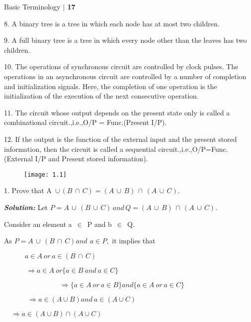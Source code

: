 \documentclass[10pt,a4paper]{book}
\begin{document}
\scriptsize

\begin{flushright}
\textsf{Basic Terminology}  \textbf{$|$ 17}
\end{flushright}


\begin{flushleft}
8. A binary tree is a tree in which each node has at most two children.

9. A full binary tree is a tree in which every node other than the leaves has two children.

10. The operations of synchronous circuit are controlled by clock pulses. The operations in an asynchronous circuit are controlled by a number of completion and initialization signals. Here, the
completion of one operation is the initialization of the execution of the next consecutive operation.

11. The circuit whose output depends on the present state only is called a combinational circuit.,i.e.,O/P = Func.(Present I/P).

12. If the output is the function of the external input and the present stored information, then the circuit
is called a sequential circuit.,i.e.,O/P=Func.(External I/P and Present stored information).
\end{flushleft}

\begin{figure}[h]
  \centering
  \texttt{[image: 1.1]}\\
\end{figure}

\begin{flushleft}
  1. Prove that A\, $\cup \,( B \,\cap \,C ) = ( A \,\cup \,B ) \,\cap\, ( A \,\cup \,C )$.
\end{flushleft}

\textbf{\textsl{Solution:}} Let $P = A \,\cup\, (B \,\cup\, C)  \,and \, Q = (A \,\cup\, B) \,\cap\, (A \,\cup\, C).$

\qquad Consider an element a\, $\in$ \,P and b\, $\in$ \,Q.

\qquad As $P = A \,\cup\, (B \,\cap\, C) and \, \:a \in P,$ it implies that
\begin{center}
$\quad \qquad a \in A\: or \:a \in (B \,\cap\, C)$

$\quad \,\qquad\Longrightarrow a \in A \:or \{a \in B \:and \:a \in C\}$

$\qquad \qquad\qquad\qquad\Longrightarrow \{a \in A \:or\: a \in B\} and \{a \in A \:or\: a \in C\}$

$\quad\quad\quad\:\,\Longrightarrow a \in (A \cup B) and \:a \in (A \cup C)$

$\quad\Longrightarrow a \in (A \cup B) \cap (A \cup C)$
\end{center}
\end{document}
